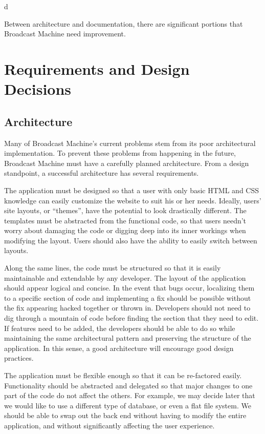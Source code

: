 d\documentclass[a4paper,12pt]{report}
\begin{document}
Between architecture and documentation, there are significant portions that Broadcast Machine need improvement.


\chapter{Requirements and Design Decisions}

\section{Architecture}

	Many of Broadcast Machine’s current problems stem from its poor architectural implementation. 
To prevent these problems from happening in the future, Broadcast Machine must have a carefully planned architecture. 
From a design standpoint, a successful architecture has several requirements.

The application must be designed so that a user with only basic HTML and CSS knowledge can easily customize the website to suit his or her needs. 
Ideally, users’ site layouts, or “themes”, have the potential to look drastically different. 
The templates must be abstracted from the functional code, so that users needn’t worry about damaging the code or digging deep into its inner workings when modifying the layout. 
Users should also have the ability to easily switch between layouts.

Along the same lines, the code must be structured so that it is easily maintainable and extendable by any developer. 
The layout of the application should appear logical and concise. 
In the event that bugs occur, localizing them to a specific section of code and implementing a fix should be possible without the fix appearing hacked together or thrown in. 
Developers should not need to dig through a mountain of code before finding the section that they need to edit. 
If features need to be added, the developers should be able to do so while maintaining the same architectural pattern and preserving the structure of the application. 
In this sense, a good architecture will encourage good design practices.

The application must be flexible enough so that it can be re-factored easily. Functionality should be abstracted and delegated so that major changes to one part of the code do not affect the others. 
For example, we may decide later that we would like to use a different type of database, or even a flat file system. We should be able to swap out the back end without having to modify the entire application, and without significantly affecting the user experience.
\end{document}
